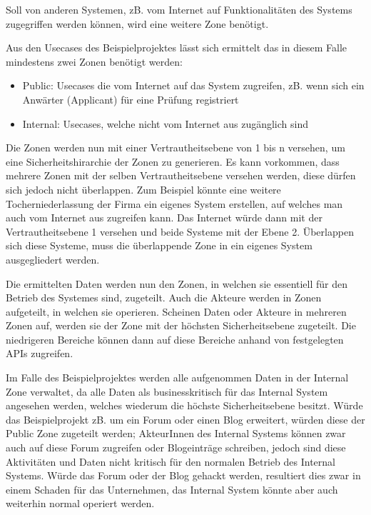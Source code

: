 Soll von anderen Systemen, zB. vom Internet auf Funktionalitäten des Systems zugegriffen werden können, wird eine weitere Zone benötigt.

Aus den Usecases des Beispielprojektes lässt sich ermittelt das in diesem Falle mindestens zwei Zonen benötigt werden:

\begin{itemize}
  \item Public: Usecases die vom Internet auf das System zugreifen, zB. wenn sich ein Anwärter (Applicant) für eine Prüfung registriert
  \item Internal: Usecases, welche nicht vom Internet aus zugänglich sind
\end{itemize}

Die Zonen werden nun mit einer Vertrautheitsebene von 1 bis n versehen, um eine Sicherheitshirarchie der Zonen zu generieren. Es kann vorkommen, dass mehrere Zonen mit der selben Vertrautheitsebene versehen werden, diese dürfen sich jedoch nicht überlappen. Zum Beispiel könnte eine weitere Tocherniederlassung der Firma ein eigenes System erstellen, auf welches man auch vom Internet aus zugreifen kann. Das Internet würde dann mit der Vertrautheitsebene 1 versehen und beide Systeme mit der Ebene 2. Überlappen sich diese Systeme, muss die überlappende Zone in ein eigenes System ausgegliedert werden.

Die ermittelten Daten werden nun den Zonen, in welchen sie essentiell für den Betrieb des Systemes sind, zugeteilt. Auch die Akteure werden in Zonen aufgeteilt, in welchen sie operieren. Scheinen Daten oder Akteure in mehreren Zonen auf, werden sie der Zone mit der höchsten Sicherheitsebene zugeteilt. Die niedrigeren Bereiche können dann auf diese Bereiche anhand von festgelegten APIs zugreifen.

Im Falle des Beispielprojektes werden alle aufgenommen Daten in der Internal Zone verwaltet, da alle Daten als businesskritisch für das Internal System angesehen werden, welches wiederum die höchste Sicherheitsebene besitzt. Würde das Beispielprojekt zB. um ein Forum oder einen Blog erweitert, würden diese der Public Zone zugeteilt werden; AkteurInnen des Internal Systems können zwar auch auf diese Forum zugreifen oder Blogeinträge schreiben, jedoch sind diese Aktivitäten und Daten nicht kritisch für den normalen Betrieb des Internal Systems. Würde das Forum oder der Blog gehackt werden, resultiert dies zwar in einem Schaden für das Unternehmen, das Internal System könnte aber auch weiterhin normal operiert werden.

